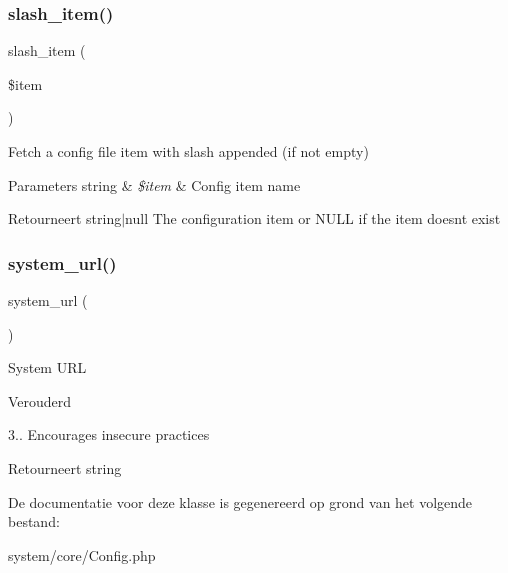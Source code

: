 \subsubsection{\texorpdfstring{slash\_item()}{slash\_item()}}
{\footnotesize\ttfamily slash\+\_\+item (\begin{DoxyParamCaption}\item[{}]{\$item }\end{DoxyParamCaption})}

Fetch a config file item with slash appended (if not empty)


\begin{DoxyParams}[1]{Parameters}
string & {\em \$item} & Config item name \\
\hline
\end{DoxyParams}
\begin{DoxyReturn}{Retourneert}
string$\vert$null The configuration item or N\+U\+LL if the item doesn\textquotesingle{}t exist 
\end{DoxyReturn}
\mbox{\label{class_c_i___config_a71e857f8dd38c230f1ce11bacf177ba8}} 
\subsubsection{\texorpdfstring{system\_url()}{system\_url()}}
{\footnotesize\ttfamily system\+\_\+url (\begin{DoxyParamCaption}{ }\end{DoxyParamCaption})}

System U\+RL

\begin{DoxyRefDesc}{Verouderd}
\item[\mbox{\hyperlink{deprecated__deprecated000001}{Verouderd}}]3.. Encourages insecure practices \end{DoxyRefDesc}
\begin{DoxyReturn}{Retourneert}
string 
\end{DoxyReturn}


De documentatie voor deze klasse is gegenereerd op grond van het volgende bestand\+:\begin{DoxyCompactItemize}
\item 
system/core/Config.\+php\end{DoxyCompactItemize}
